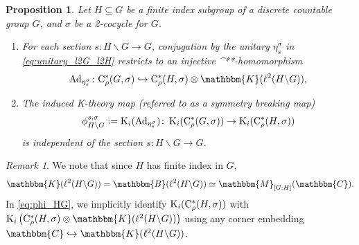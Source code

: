 \documentclass{amsart}
\numberwithin{figure}{section}
\numberwithin{equation}{section}
\numberwithin{table}{section}
\theoremstyle{plain}
\newtheorem{proposition}[equation]{Proposition}
\theoremstyle{definition}
\theoremstyle{remark}
\newtheorem{remark}[equation]{Remark}
\theoremstyle{nonumber}
\newcommand{\C}{\mathbb{C}}
\newcommand{\Mat}{\mathbb{M}}
\newcommand{\Cpt}{\mathbb{K}}
\newcommand{\Bdd}{\mathbb{B}}
\newcommand{\K}{\relax\ifmmode\operatorname{K}\else\textup{K}\fi}
\newcommand{\st}{\relax\ifmmode{}^*\else{}\textup{*}\fi}
\newcommand{\Cst}{\relax\ifmmode\mathrm{C}^*\else\textup{C*}\fi}
\newcommand{\Cstr}{\Cst_\rho} %
\newcommand{\Ad}{\operatorname{Ad}} %
\newcommand{\defeq}{\mathrel{\vcentcolon=}}
\renewcommand{\mathbb}{\mathbbm} %
\begin{document}
\begin{proposition}\label{prop:i_GH}
Let $H\subseteq G$ be a finite index subgroup of a discrete countable group
$G$, and $\sigma$ be a 2-cocycle for $G$.
\begin{enumerate}
\item For each section
$s\colon H\backslash G\to G$, conjugation by the unitary \(
\eta_s^{\sigma} \) in \eqref{eq:unitary_l2G_l2H} restricts to an injective \st-homomorphism
\[
\Ad_{\eta_{s}^\sigma}\colon\Cstr(G,\sigma)\hookrightarrow\Cstr(H,\sigma)\otimes \Cpt(\ell^2(H\backslash G)),
\]
\item The induced \K-theory map (referred to as a \emph{symmetry breaking} map)
\begin{equation}\label{eq:phi_HG}
\phi_{H\backslash G}^{s,\sigma}\defeq\K_i(\Ad_{\eta_s^\sigma})\colon
\K_i(\Cstr(G,\sigma))\to\K_i(\Cstr(H,\sigma))
\end{equation}
is independent of the section \( s\colon H\backslash G\to G \).

\end{enumerate}
\end{proposition}

\begin{remark}\label{rem:symm.break.stabilization}
We note that since \( H \) has finite index in \( G \),   
\[
  \Cpt(\ell^2(H\backslash G))=\Bdd(\ell^2(H\backslash
  G))\simeq\Mat_{[G:H]}(\C). 
\]
In \eqref{eq:phi_HG}, we implicitly identify \( \K_i(\Cstr(H,\sigma)) \) with \(
\K_i\big(\Cstr(H,\sigma)\otimes\Cpt(\ell^2(H\backslash G))\big) \) using any corner
embedding \( \C\hookrightarrow \Cpt(\ell^2(H\backslash G)) \).
\end{remark}
\end{document}
